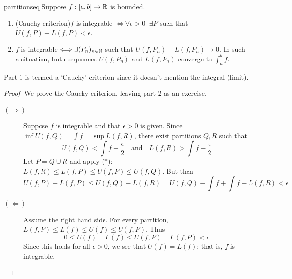 \begin{thm}{}{partitionseq}
	Suppose $f:[a,b]\to\mathbb{R}$ is bounded.
	\begin{enumerate}
	  \item\label{thm:partitionseq1} (Cauchy criterion)\lstsp $f$ is integrable $\Longleftrightarrow\forall\epsilon>0$, $\exists P$ such that $U(f,P)-L(f,P)<\epsilon$.
	  \item $f$ is integrable $\Longleftrightarrow\exists (P_n)_{n\in\mathbb{N}}$ such that $U(f,P_n)-L(f,P_n)\to 0$. In such a situation, both sequences $U(f,P_n)$ and $L(f,P_n)$ converge to $\int_a^bf$.
	\end{enumerate} 
\end{thm}

Part 1 is termed a `Cauchy' criterion since it doesn't mention the integral (limit). 


\begin{proof}
	We prove the Cauchy criterion, leaving part 2 as an exercise. 
	\begin{description}
		\item[$(\Rightarrow)$] Suppose $f$ is integrable and that $\epsilon>0$ is given. Since $\inf U(f,Q)=\int f=\sup L(f,R)$, there exist partitions $Q,R$ such that
		\[
			U(f,Q)<\int f+\frac\epsilon 2
			\quad\text{and}\quad 
			L(f,R)>\int f-\frac \epsilon 2
		\]
		Let $P=Q\cup R$ and apply ($\ast$): \ $L(f,R)\le L(f,P)\le U(f,P)\le U(f,Q)$. But then
		\[
			U(f,P)-L(f,P)\le U(f,Q)-L(f,R) 
			=U(f,Q)-\int f+\int f-L(f,R)<\epsilon
		\]
		\item[$(\Leftarrow)$] Assume the right hand side. For every partition, $L(f,P)\le L(f)\le U(f)\le U(f,P)$. Thus
		\[
			0\le U(f)-L(f)\le U(f,P)-L(f,P)<\epsilon
		\]
		Since this holds for all $\epsilon>0$, we see that $U(f)=L(f)$: that is, $f$ is integrable.\qedhere
	\end{description}
\end{proof}

\goodbreak


